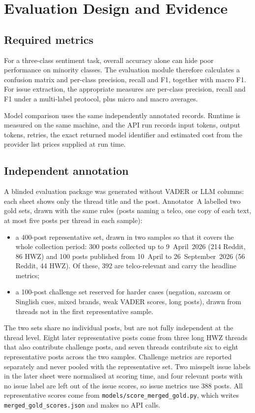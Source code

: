\documentclass[11pt,a4paper]{article}
\begin{document}
\section{Evaluation Design and Evidence}

\subsection{Required metrics}

For a three-class sentiment task, overall accuracy alone can hide poor performance on minority classes. The evaluation module therefore calculates a confusion matrix and per-class precision, recall and F1, together with macro F1. For issue extraction, the appropriate measures are per-class precision, recall and F1 under a multi-label protocol, plus micro and macro averages.

Model comparison uses the same independently annotated records. Runtime is measured on the same machine, and the API run records input tokens, output tokens, retries, the exact returned model identifier and estimated cost from the provider list prices supplied at run time.

\subsection{Independent annotation}

A blinded evaluation package was generated without VADER or LLM columns: each sheet shows only the thread title and the post. Annotator~A labelled two gold sets, drawn with the same rules (posts naming a telco, one copy of each text, at most five posts per thread in each sample):

\begin{itemize}
  \item a 400-post representative set, drawn in two samples so that it covers the whole collection period: 300 posts collected up to 9~April~2026 (214 Reddit, 86 HWZ) and 100 posts published from 10~April to 26~September~2026 (56 Reddit, 44 HWZ). Of these, 392 are telco-relevant and carry the headline metrics;
  \item a 100-post challenge set reserved for harder cases (negation, sarcasm or Singlish cues, mixed brands, weak VADER scores, long posts), drawn from threads not in the first representative sample.
\end{itemize}

The two sets share no individual posts, but are not fully independent at the thread level. Eight later representative posts come from three long HWZ threads that also contribute challenge posts, and seven threads contribute six to eight representative posts across the two samples. Challenge metrics are reported separately and never pooled with the representative set. Two misspelt issue labels in the later sheet were normalised at scoring time, and four relevant posts with no issue label are left out of the issue scores, so issue metrics use 388 posts. All representative scores come from \texttt{models/score\_merged\_gold.py}, which writes \texttt{merged\_gold\_scores.json} and makes no API calls.
\end{document}
